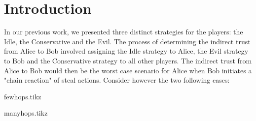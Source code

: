 \section{Introduction}
  In our previous work, we presented three distinct strategies for the players: the Idle, the Conservative and the Evil. The
  process of determining the indirect trust from Alice to Bob involved assigning the Idle strategy to Alice, the Evil strategy
  to Bob and the Conservative strategy to all other players. The indirect trust from Alice to Bob would then be the worst case
  scenario for Alice when Bob initiates a "chain reaction" of steal actions. Consider however the two following cases:

  {fewhops.tikz}

  {manyhops.tikz}

